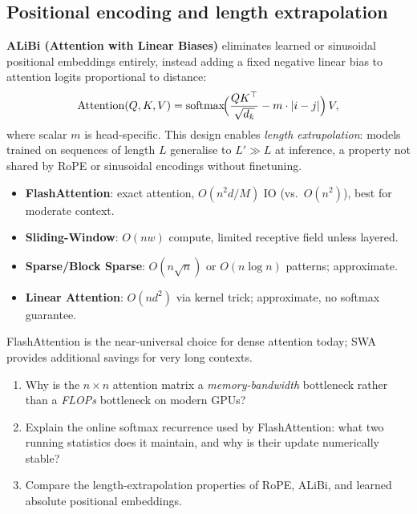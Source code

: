 \documentclass[11pt,a4paper]{article}
\DeclareMathOperator{\softmax}{softmax}
\begin{document}
	\subsection{Positional encoding and length extrapolation}

	\textbf{ALiBi (Attention with Linear Biases)} \parencite{press2022alibi} eliminates learned or sinusoidal positional embeddings entirely, instead adding a fixed negative linear bias to attention logits proportional to distance:
	\begin{equation}
		\mathrm{Attention}(Q, K, V) = \softmax\!\Bigl(\frac{QK^\top}{\sqrt{d_k}} - m \cdot |i - j|\Bigr)\,V,
	\end{equation}
	where scalar $m$ is head-specific. This design enables \emph{length extrapolation}: models trained on sequences of length $L$ generalise to $L' \gg L$ at inference, a property not shared by RoPE or sinusoidal encodings without finetuning.

	\begin{keyconcept}
		\begin{itemize}[nosep]
			\item \textbf{FlashAttention}: exact attention, $O(n^2 d/M)$ IO (vs.\ $O(n^2)$), best for moderate context.
			\item \textbf{Sliding-Window}: $O(nw)$ compute, limited receptive field unless layered.
			\item \textbf{Sparse/Block Sparse}: $O(n \sqrt{n})$ or $O(n \log n)$ patterns; approximate.
			\item \textbf{Linear Attention}: $O(nd^2)$ via kernel trick; approximate, no softmax guarantee.
		\end{itemize}
		FlashAttention is the near-universal choice for dense attention today; SWA provides additional savings for very long contexts.
	\end{keyconcept}

	\begin{checkpoint}
		\begin{enumerate}
			\item Why is the $n \times n$ attention matrix a \emph{memory-bandwidth} bottleneck rather than a \emph{FLOPs} bottleneck on modern GPUs?
			\item Explain the online softmax recurrence used by FlashAttention: what two running statistics does it maintain, and why is their update numerically stable?
			\item Compare the length-extrapolation properties of RoPE, ALiBi, and learned absolute positional embeddings.
		\end{enumerate}
	\end{checkpoint}
\end{document}
